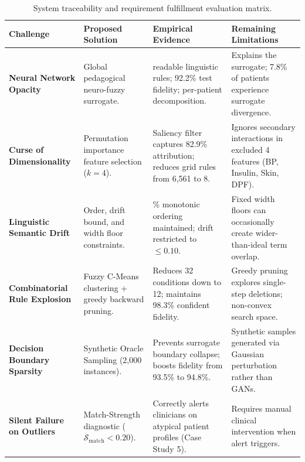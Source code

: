 \documentclass[12pt,a4paper,oneside]{report}
\begin{document}
\begin{table}[htbp]
\centering
\small
\renewcommand{\arraystretch}{0.9}
\begin{tabularx}{\textwidth}{>{\raggedright\arraybackslash\hsize=0.75\hsize}X >{\raggedright\arraybackslash\hsize=0.85\hsize}X >{\raggedright\arraybackslash\hsize=1.05\hsize}X >{\raggedright\arraybackslash\hsize=1.35\hsize}X}
\toprule
\textbf{Challenge} & \textbf{Proposed Solution} & \textbf{Empirical Evidence} & \textbf{Remaining Limitations} \\
\midrule
\textbf{Neural Network Opacity} & Global pedagogical neuro-fuzzy surrogate. & 4 readable linguistic rules; 92.2\% test fidelity; per-patient decomposition. & Explains the surrogate; 7.8\% of patients experience surrogate divergence. \\
\midrule
\textbf{Curse of Dimensionality} & Permutation importance feature selection ($k=4$). & Saliency filter captures 82.9\% attribution; reduces grid rules from 6,561 to 8. & Ignores secondary interactions in excluded 4 features (BP, Insulin, Skin, DPF). \\
\midrule
\textbf{Linguistic Semantic Drift} & Order, drift bound, and width floor constraints. & 100\% monotonic ordering maintained; drift restricted to $\le 0.10$. & Fixed width floors can occasionally create wider-than-ideal term overlap. \\
\midrule
\textbf{Combinatorial Rule Explosion} & Fuzzy C-Means clustering + greedy backward pruning. & Reduces 32 conditions down to 12; maintains 98.3\% confident fidelity. & Greedy pruning explores single-step deletions; non-convex search space. \\
\midrule
\textbf{Decision Boundary Sparsity} & Synthetic Oracle Sampling (2,000 instances). & Prevents surrogate boundary collapse; boosts fidelity from 93.5\% to 94.8\%. & Synthetic samples generated via Gaussian perturbation rather than GANs. \\
\midrule
\textbf{Silent Failure on Outliers} & Match-Strength diagnostic ($\mathcal{S}_{\text{match}} < 0.20$). & Correctly alerts clinicians on atypical patient profiles (Case Study 5). & Requires manual clinical intervention when alert triggers. \\
\bottomrule
\end{tabularx}
\caption[System Traceability and Requirement Evaluation Matrix]{System traceability and requirement fulfillment evaluation matrix.}
\label{tab:traceability_table}
\end{table}
\end{document}
